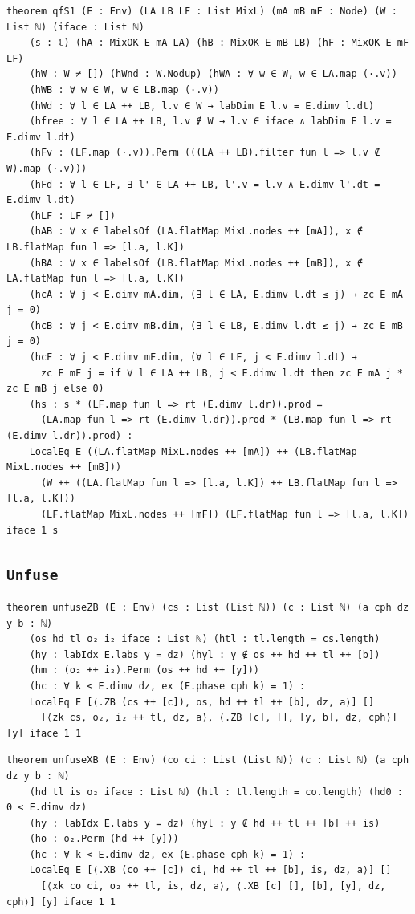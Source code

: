 \begin{lstlisting}[style=leancore]
theorem qfS1 (E : Env) (LA LB LF : List MixL) (mA mB mF : Node) (W : List ℕ) (iface : List ℕ)
    (s : ℂ) (hA : MixOK E mA LA) (hB : MixOK E mB LB) (hF : MixOK E mF LF)
    (hW : W ≠ []) (hWnd : W.Nodup) (hWA : ∀ w ∈ W, w ∈ LA.map (·.v))
    (hWB : ∀ w ∈ W, w ∈ LB.map (·.v))
    (hWd : ∀ l ∈ LA ++ LB, l.v ∈ W → labDim E l.v = E.dimv l.dt)
    (hfree : ∀ l ∈ LA ++ LB, l.v ∉ W → l.v ∈ iface ∧ labDim E l.v = E.dimv l.dt)
    (hFv : (LF.map (·.v)).Perm (((LA ++ LB).filter fun l => l.v ∉ W).map (·.v)))
    (hFd : ∀ l ∈ LF, ∃ l' ∈ LA ++ LB, l'.v = l.v ∧ E.dimv l'.dt = E.dimv l.dt)
    (hLF : LF ≠ [])
    (hAB : ∀ x ∈ labelsOf (LA.flatMap MixL.nodes ++ [mA]), x ∉ LB.flatMap fun l => [l.a, l.K])
    (hBA : ∀ x ∈ labelsOf (LB.flatMap MixL.nodes ++ [mB]), x ∉ LA.flatMap fun l => [l.a, l.K])
    (hcA : ∀ j < E.dimv mA.dim, (∃ l ∈ LA, E.dimv l.dt ≤ j) → zc E mA j = 0)
    (hcB : ∀ j < E.dimv mB.dim, (∃ l ∈ LB, E.dimv l.dt ≤ j) → zc E mB j = 0)
    (hcF : ∀ j < E.dimv mF.dim, (∀ l ∈ LF, j < E.dimv l.dt) →
      zc E mF j = if ∀ l ∈ LA ++ LB, j < E.dimv l.dt then zc E mA j * zc E mB j else 0)
    (hs : s * (LF.map fun l => rt (E.dimv l.dr)).prod =
      (LA.map fun l => rt (E.dimv l.dr)).prod * (LB.map fun l => rt (E.dimv l.dr)).prod) :
    LocalEq E ((LA.flatMap MixL.nodes ++ [mA]) ++ (LB.flatMap MixL.nodes ++ [mB]))
      (W ++ ((LA.flatMap fun l => [l.a, l.K]) ++ LB.flatMap fun l => [l.a, l.K]))
      (LF.flatMap MixL.nodes ++ [mF]) (LF.flatMap fun l => [l.a, l.K]) iface 1 s
\end{lstlisting}

\subsection{\texttt{Unfuse}}
\begin{lstlisting}[style=leancore]
theorem unfuseZB (E : Env) (cs : List (List ℕ)) (c : List ℕ) (a cph dz y b : ℕ)
    (os hd tl o₂ i₂ iface : List ℕ) (htl : tl.length = cs.length)
    (hy : labIdx E.labs y = dz) (hyl : y ∉ os ++ hd ++ tl ++ [b])
    (hm : (o₂ ++ i₂).Perm (os ++ hd ++ [y]))
    (hc : ∀ k < E.dimv dz, ex (E.phase cph k) = 1) :
    LocalEq E [⟨.ZB (cs ++ [c]), os, hd ++ tl ++ [b], dz, a⟩] []
      [⟨zk cs, o₂, i₂ ++ tl, dz, a⟩, ⟨.ZB [c], [], [y, b], dz, cph⟩] [y] iface 1 1
\end{lstlisting}
\begin{lstlisting}[style=leancore]
theorem unfuseXB (E : Env) (co ci : List (List ℕ)) (c : List ℕ) (a cph dz y b : ℕ)
    (hd tl is o₂ iface : List ℕ) (htl : tl.length = co.length) (hd0 : 0 < E.dimv dz)
    (hy : labIdx E.labs y = dz) (hyl : y ∉ hd ++ tl ++ [b] ++ is)
    (ho : o₂.Perm (hd ++ [y]))
    (hc : ∀ k < E.dimv dz, ex (E.phase cph k) = 1) :
    LocalEq E [⟨.XB (co ++ [c]) ci, hd ++ tl ++ [b], is, dz, a⟩] []
      [⟨xk co ci, o₂ ++ tl, is, dz, a⟩, ⟨.XB [c] [], [b], [y], dz, cph⟩] [y] iface 1 1
\end{lstlisting}

